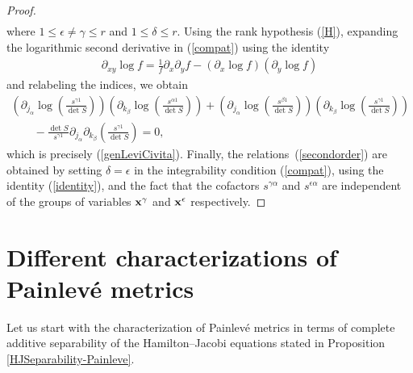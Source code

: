 \documentclass[pdftex]{sigma}
\numberwithin{equation}{section}
\newcommand{\jalpha}{j_{\alpha}}
\newcommand{\kbeta}{k_{\beta}}
\begin{document}
\begin{proof}
\begin{gather}
\end{gather}
where $1\leq \epsilon \neq \gamma \leq r$ and $1\leq \delta \leq r$. Using the rank hypothesis (\ref{H}), expanding the logarithmic second derivative in (\ref{compat}) using the identity
\begin{gather}\label{identity}
\partial_{xy}\log f = \frac{1}{f}\partial_{x}\partial_{y}f-(\partial_{x}\log f)(\partial_{y}\log f)
\end{gather}
and
 relabeling the indices, we obtain
\begin{gather*}
\left(\partial_{\jalpha}\log\left(\frac{s^{\gamma 1}}{\det S}\right)\right) \left(\partial_{\kbeta}\log\left(\frac{s^{\alpha 1}}{\det S}\right)\right)+\left(\partial_{\jalpha}\log\left(\frac{s^{\beta 1}}{\det S}\right)\right)\left(\partial_{\kbeta}\log\left(\frac{s^{\gamma 1}}{\det S}\right)\right)\\
\qquad{}-\frac{\det S}{s^{\gamma 1}}\partial_{\jalpha}\partial_{\kbeta}\left(\frac{s^{\gamma 1}}{\det S}\right)=0,
\end{gather*}
which is precisely (\ref{genLeviCivita}). Finally, the relations~(\ref{secondorder}) are obtained by setting $\delta = \epsilon$ in the integrability condition (\ref{compat}), using the identity (\ref{identity}), and the fact that the cofactors $s^{\gamma \alpha}$ and $s^{\epsilon \alpha}$ are independent of the groups of variables ${\bf x}^{\gamma}$ and ${\bf x}^{\epsilon}$ respectively.
\end{proof}

\section{Different characterizations of Painlev\'e metrics}\label{PainHJSection}

Let us start with the characterization of Painlev\'e metrics in terms of complete additive separability of the Hamilton--Jacobi equations stated in Proposition \ref{HJSeparability-Painleve}.
\end{document}
